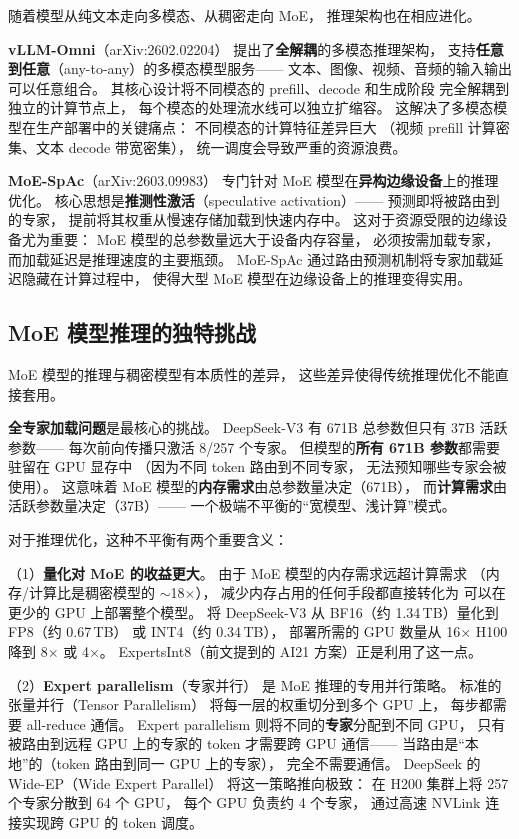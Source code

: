 随着模型从纯文本走向多模态、从稠密走向 MoE，
推理架构也在相应进化。

\textbf{vLLM-Omni}（arXiv:2602.02204）
提出了\textbf{全解耦}的多模态推理架构，
支持\textbf{任意到任意}（any-to-any）的多模态模型服务——
文本、图像、视频、音频的输入输出可以任意组合。
其核心设计将不同模态的 prefill、decode 和生成阶段
完全解耦到独立的计算节点上，
每个模态的处理流水线可以独立扩缩容。
这解决了多模态模型在生产部署中的关键痛点：
不同模态的计算特征差异巨大
（视频 prefill 计算密集、文本 decode 带宽密集），
统一调度会导致严重的资源浪费。

\textbf{MoE-SpAc}（arXiv:2603.09983）
专门针对 MoE 模型在\textbf{异构边缘设备}上的推理优化。
核心思想是\textbf{推测性激活}（speculative activation）——
预测即将被路由到的专家，
提前将其权重从慢速存储加载到快速内存中。
这对于资源受限的边缘设备尤为重要：
MoE 模型的总参数量远大于设备内存容量，
必须按需加载专家，
而加载延迟是推理速度的主要瓶颈。
MoE-SpAc 通过路由预测机制将专家加载延迟隐藏在计算过程中，
使得大型 MoE 模型在边缘设备上的推理变得实用。

\subsection{MoE 模型推理的独特挑战}

MoE 模型的推理与稠密模型有本质性的差异，
这些差异使得传统推理优化不能直接套用。

\textbf{全专家加载问题}是最核心的挑战。
DeepSeek-V3 有 671B 总参数但只有 37B 活跃参数——
每次前向传播只激活 8/257 个专家。
但模型的\textbf{所有 671B 参数}都需要驻留在 GPU 显存中
（因为不同 token 路由到不同专家，
无法预知哪些专家会被使用）。
这意味着 MoE 模型的\textbf{内存需求}由总参数量决定（671B），
而\textbf{计算需求}由活跃参数量决定（37B）——
一个极端不平衡的“宽模型、浅计算”模式。

对于推理优化，这种不平衡有两个重要含义：

（1）\textbf{量化对 MoE 的收益更大}。
由于 MoE 模型的内存需求远超计算需求
（内存/计算比是稠密模型的 $\sim$18$\times$），
减少内存占用的任何手段都直接转化为
可以在更少的 GPU 上部署整个模型。
将 DeepSeek-V3 从 BF16（约 1.34\,TB）量化到 FP8（约 0.67\,TB）
或 INT4（约 0.34\,TB），
部署所需的 GPU 数量从 16$\times$ H100 降到 8$\times$ 或 4$\times$。
ExpertsInt8（前文提到的 AI21 方案）正是利用了这一点。

（2）\textbf{Expert parallelism}（专家并行）
是 MoE 推理的专用并行策略。
标准的张量并行（Tensor Parallelism）
将每一层的权重切分到多个 GPU 上，
每步都需要 all-reduce 通信。
Expert parallelism 则将不同的\textbf{专家}分配到不同 GPU，
只有被路由到远程 GPU 上的专家的 token
才需要跨 GPU 通信——
当路由是“本地”的（token 路由到同一 GPU 上的专家），
完全不需要通信。
DeepSeek 的 Wide-EP（Wide Expert Parallel）
将这一策略推向极致：
在 H200 集群上将 257 个专家分散到 64 个 GPU，
每个 GPU 负责约 4 个专家，
通过高速 NVLink 连接实现跨 GPU 的 token 调度。

